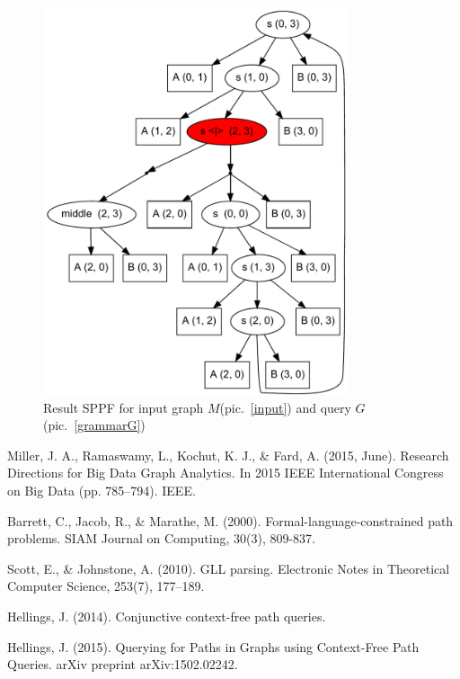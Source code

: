 \documentclass{sig-alternate} %
\begin{document}
\begin{figure}[h]
    \begin{center}
        \includegraphics[width=9cm]{dot/AnBn.pdf}
        \caption{Result SPPF for input graph $M$(pic.~\ref{input}) and query $G$(pic.~\ref{grammarG})}
        \label{SPPF}        
    \end{center}
\end{figure}


\begin{thebibliography}{9}
  
Miller, J. A., Ramaswamy, L., Kochut, K. J., \& Fard, A. (2015, June). Research Directions for Big Data Graph Analytics. In 2015 IEEE International Congress on Big Data (pp. 785--794). IEEE.

Barrett, C., Jacob, R., \& Marathe, M. (2000). Formal-language-constrained path problems. SIAM Journal on Computing, 30(3), 809-837.

Scott, E., \& Johnstone, A. (2010). GLL parsing. Electronic Notes in Theoretical Computer Science, 253(7), 177--189.

Hellings, J. (2014). Conjunctive context-free path queries.

Hellings, J. (2015). Querying for Paths in Graphs using Context-Free Path Queries. arXiv preprint 
arXiv:1502.02242.


\end{thebibliography}
\end{document}

